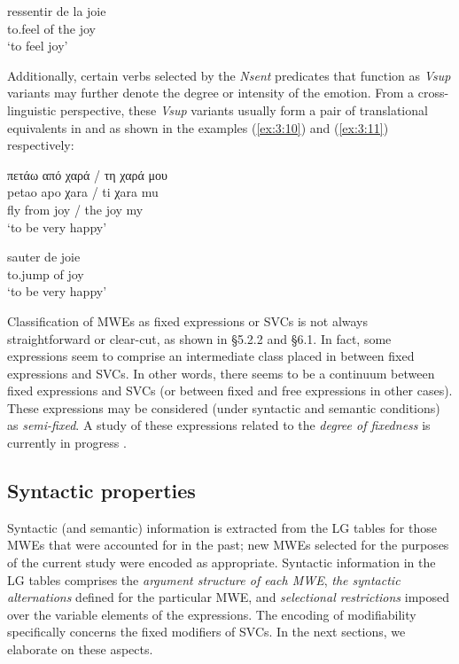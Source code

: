 \documentclass[output=paper]{langsci/langscibook}
\begin{document}
\begin{exe}
\ex \label{ex:3:9}
\gll ressentir de la joie \\
to.feel of the joy\\
\glt ‘to feel joy’
\end{exe}

Additionally, certain verbs selected by the \textit{Nsent} predicates
that function as \textit{Vsup} variants may further denote the degree or
 intensity of the emotion. From a  cross-linguistic perspective, these
\textit{Vsup} variants usually form a pair of translational equivalents
in  and  as shown in the examples (\ref{ex:3:10}) and (\ref{ex:3:11}) respectively:

\begin{exe}
\ex \label{ex:3:10}
\glll  πετάω από χαρά / τη χαρά μου \\
petao apo χara / ti χara mu\\
fly from joy / the joy my\\
\glt %
‘to be very happy’
\end{exe}

\begin{exe}
\ex \label{ex:3:11}
\gll sauter de joie\\
to.jump of joy\\
\glt ‘to be very happy’
\end{exe}


Classification of MWEs as fixed expressions or SVCs is not always
straightforward or clear-cut, as shown in  §5.2.2 and  §6.1. In
fact, some expressions seem to comprise an intermediate class placed in
between fixed expressions and SVCs. In other words, there seems to be a
continuum between fixed expressions and SVCs (or between fixed and free
expressions in other cases). These expressions may be considered (under
syntactic and semantic conditions) as \textit{semi-fixed}. 
A study of
these expressions related to the \textit{degree of fixedness} is
currently in progress \citep{constant2016}. 

\subsection{Syntactic properties}

Syntactic (and semantic) information is extracted from the LG tables for
those MWEs that were accounted for in the past; new MWEs selected for
the purposes of the current study were encoded as appropriate.
Syntactic information in the LG tables comprises the 
\textit{argument structure of each MWE}, \textit{the syntactic
alternations} defined for the particular MWE, and
\textit{selectional restrictions} imposed over the variable
elements of the expressions. The encoding of modifiability specifically concerns
the fixed modifiers of SVCs. In the next sections, we elaborate on these
aspects.
\end{document}
